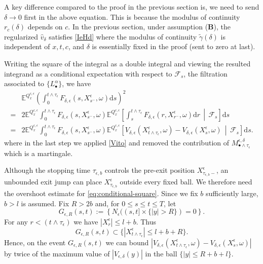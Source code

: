 \documentclass[11pt,reqno]{amsart}
\theoremstyle{definition}
\theoremstyle{remark}
\numberwithin{equation}{section}
\newcommand{\eps}{\epsilon}
\newcommand{\dd}{\mathrm{d}}
\begin{document}
A key difference compared to the proof in the previous section is, we need to send $\delta\to 0$ first in the above equation. This is because the modulus of continuity $r_c(\delta)$ depends on $c$. In the previous section, under assumption ({\bf B}), the regularized $\hat{v}_\delta$ satisfies \eqref{IeHd} where the modulus of continuity $\widetilde{\gamma}(\delta)$ is independent of $x,t,c$, and $\delta$ is essentially fixed in the proof (sent to zero at last).

Writing the square of the integral as a double integral and viewing the resulted integrand as a conditional expectation with respect to $\mathcal{F}_s$, the filtration associated to $\{L^\alpha_\bullet\}$, we have
\begin{equation}
\label{eq:conditional-square}
\begin{aligned}
 &\mathbb E^{Q_x^{c,\epsilon}}
\left( \int_0^{t\wedge\tau_\epsilon}F_{\delta,\epsilon}(s,X_{s^{-}}^\epsilon,\omega)\mathrm ds \right)^2\\
=&2\mathbb E^{Q_x^{c,\epsilon}}
 \int_0^{t\wedge\tau_\epsilon}
 F_{\delta,\epsilon}(s,X_{s^-}^\epsilon,\omega) \mathbb E^{Q_x^{c,\epsilon}}\!\left[\int_s^{t\wedge \tau_\eps} F_{\delta,\epsilon}(r,X_{r^-}^\epsilon,\omega) \dd r\,\middle|\,\mathcal F_s\right]
 \dd s\\
 =&2\mathbb E^{Q_x^{c,\epsilon}}
 \int_0^{t\wedge\tau_\epsilon}
 F_{\delta,\epsilon}(s,X_{s^-}^\epsilon,\omega) 
\mathbb E^{Q_x^{c,\epsilon}}\!\left[V_{\delta,\epsilon}(X_{t\wedge\tau_\epsilon}^\epsilon,\omega)-V_{\delta,\epsilon}(X_s^\epsilon,\omega)\,\middle|\,\mathcal F_s \right]\dd s .
\end{aligned}
\end{equation}
where in the last step we applied \eqref{Vito} and removed the contribution of $M^{\eps,\delta}_{\bullet\wedge \tau_\eps}$ which is a martingale. 

Although the stopping time $\tau_{\epsilon,b}$ controls the pre-exit position $X^\epsilon_{\tau_{\epsilon,b}-}$, an unbounded exit jump can place $X^\epsilon_{\tau_{\epsilon,b}}$ outside every fixed ball.
We therefore need the overshoot estimate for \eqref{eq:conditional-square}. Since we fix $b$ sufficiently large, $b>l$ is assumed. Fix $R>2b$ and, for
$0\leq s\leq t\leq T$, let
\[
 G_{\epsilon,R}(s,t):=
 \left\{
 N_\epsilon((s,t]\times\{|y|>R\})=0
 \right\}.
\]
For any $r < (t\wedge \tau_\epsilon)$ we have $|X_r^\epsilon|\leq l+b$. Thus 
\[
G_{\epsilon,R}(s,t) \subset \big\{|X_{t\wedge\tau_\epsilon}^\epsilon|\leq l+b+R \big\}.
\]
Hence, on the event $G_{\eps,R}(s,t)$ we can bound $|V_{\delta,\epsilon}(X_{t\wedge\tau_\epsilon}^\epsilon,\omega)-V_{\delta,\epsilon}(X_s^\epsilon,\omega)|$ by twice of the maximum value of $|V_{\eps,\delta}(y)|$ in the ball $\{|y| \le R+b+l\}$.
\end{document}
